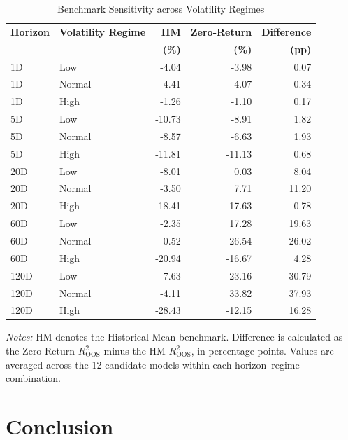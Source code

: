 \documentclass[12pt,twoside]{ord}
\makeatletter
\providecommand{\FloatBarrier}{\par\ifx\@deferlist\@empty\else\clearpage\fi}
\makeatother
\begin{document}
\begin{table}[htbp]
\centering
\caption{Benchmark Sensitivity across Volatility Regimes}
\label{tab:benchmark_regimes}
\small
\setlength{\tabcolsep}{7pt}
\renewcommand{\arraystretch}{1.15}
\begin{tabular}{llrrr}
\hline
\textbf{Horizon} & \textbf{Volatility Regime}
& \textbf{HM} & \textbf{Zero-Return} & \textbf{Difference} \\
& & \textbf{(\%)} & \textbf{(\%)} & \textbf{(pp)} \\
\hline
1D   & Low    & -4.04  & -3.98  &  0.07 \\
1D   & Normal & -4.41  & -4.07  &  0.34 \\
1D   & High   & -1.26  & -1.10  &  0.17 \\
\hline
5D   & Low    & -10.73 & -8.91  &  1.82 \\
5D   & Normal & -8.57  & -6.63  &  1.93 \\
5D   & High   & -11.81 & -11.13 &  0.68 \\
\hline
20D  & Low    & -8.01  &  0.03  &  8.04 \\
20D  & Normal & -3.50  &  7.71  & 11.20 \\
20D  & High   & -18.41 & -17.63 &  0.78 \\
\hline
60D  & Low    & -2.35  & 17.28  & 19.63 \\
60D  & Normal &  0.52  & 26.54  & 26.02 \\
60D  & High   & -20.94 & -16.67 &  4.28 \\
\hline
120D & Low    & -7.63  & 23.16  & 30.79 \\
120D & Normal & -4.11  & 33.82  & 37.93 \\
120D & High   & -28.43 & -12.15 & 16.28 \\
\hline
\end{tabular}
\par\vspace{4pt}\parbox{\linewidth}{\fontsize{9pt}{12pt}\selectfont\textit{Notes:} HM denotes the Historical Mean benchmark. Difference is calculated as the Zero-Return $R^2_{\mathrm{OOS}}$ minus the HM $R^2_{\mathrm{OOS}}$, in percentage points. Values are averaged across the 12 candidate models within each horizon--regime combination.}
\end{table}

\FloatBarrier

\section{Conclusion}\label{sec:conclusion}
\end{document}
